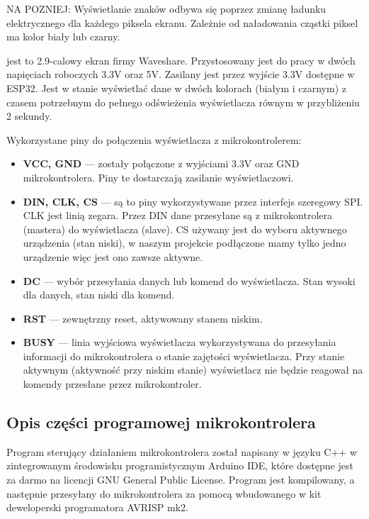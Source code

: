 \documentclass[a4paper,12pt, twoside]{article}
\begin{document}
       NA POZNIEJ: Wyświetlanie znaków odbywa się poprzez zmianę ładunku elektrycznego dla każdego piksela ekranu. Zależnie od naładowania cząstki piksel ma kolor biały lub czarny.
        
        jest to 2.9-calowy ekran firmy Waveshare. Przystosowany jest do pracy w dwóch napięciach roboczych 3.3V oraz 5V. Zasilany jest przez wyjście 3.3V dostępne w ESP32. Jest w stanie wyświetlać dane w dwóch kolorach (białym i czarnym) z czasem potrzebnym do pełnego odświeżenia wyświetlacza równym w przybliżeniu 2 sekundy\cite{waveshare}.
        
        Wykorzystane piny do połączenia wyświetlacza z mikrokontrolerem: 
        \begin{itemize}
            \item \textbf{VCC, GND} — zostały połączone z wyjściami 3.3V oraz GND mikrokontrolera. Piny te dostarczają zasilanie wyświetlaczowi.
            \item \textbf{DIN, CLK, CS} — są to piny wykorzystywane przez interfejs szeregowy SPI. CLK jest linią zegara. Przez DIN dane przesyłane są z mikrokontrolera (mastera) do wyświetlacza (slave). CS używany jest do wyboru aktywnego urządzenia (stan niski), w naszym projekcie podłączone mamy tylko jedno urządzenie więc jest ono zawsze aktywne.
            \item \textbf{DC} — wybór przesyłania danych lub komend do wyświetlacza. Stan wysoki dla danych, stan niski dla komend.
            \item \textbf{RST} — zewnętrzny reset, aktywowany stanem niskim.
            \item \textbf{BUSY}  — linia wyjściowa wyświetlacza wykorzystywana do przesyłania informacji do mikrokontrolera o stanie zajętości wyświetlacza. Przy stanie aktywnym (aktywność przy niskim stanie) wyświetlacz nie będzie reagował na komendy przesłane przez mikrokontroler. 
        \end{itemize}
        
        \subsection{Opis części programowej mikrokontrolera}
    	Program sterujący działaniem mikrokontrolera został napisany w języku C++ w zintegrowanym środowisku programistycznym Arduino IDE, które dostępne jest za darmo na licencji GNU General Public License. Program jest kompilowany, a następnie przesyłany do mikrokontrolera za pomocą wbudowanego w kit deweloperski programatora AVRISP mk2.
   
\end{document}
